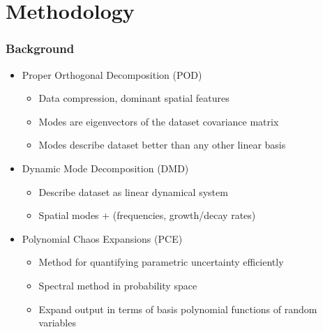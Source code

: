 \documentclass[9pt]{beamer}
\begin{document}
\section{Methodology}
\label{sec-2}
\begin{frame}
\frametitle{Background}
\label{sec-2-1}

\begin{itemize}
\item Proper Orthogonal Decomposition (POD)
\begin{itemize}
\item Data compression, dominant spatial features
\item Modes are eigenvectors of the dataset covariance matrix
\item Modes describe dataset better than any other linear basis
\end{itemize}
\item Dynamic Mode Decomposition (DMD)
\begin{itemize}
\item Describe dataset as linear dynamical system
\item Spatial modes + (frequencies, growth/decay rates)
\end{itemize}
\item Polynomial Chaos Expansions (PCE)
\begin{itemize}
\item Method for quantifying parametric uncertainty efficiently
\item Spectral method in probability space
\item Expand output in terms of basis polynomial functions of random variables
\end{itemize}
\end{itemize}
\end{frame}
\end{document}
